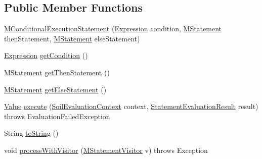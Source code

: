 \subsection*{Public Member Functions}
\begin{DoxyCompactItemize}
\item 
\hyperlink{classorg_1_1tzi_1_1use_1_1uml_1_1sys_1_1soil_1_1_m_conditional_execution_statement_a8b14f4421b03f5361b62804e4371c446}{M\-Conditional\-Execution\-Statement} (\hyperlink{classorg_1_1tzi_1_1use_1_1uml_1_1ocl_1_1expr_1_1_expression}{Expression} condition, \hyperlink{classorg_1_1tzi_1_1use_1_1uml_1_1sys_1_1soil_1_1_m_statement}{M\-Statement} then\-Statement, \hyperlink{classorg_1_1tzi_1_1use_1_1uml_1_1sys_1_1soil_1_1_m_statement}{M\-Statement} else\-Statement)
\item 
\hyperlink{classorg_1_1tzi_1_1use_1_1uml_1_1ocl_1_1expr_1_1_expression}{Expression} \hyperlink{classorg_1_1tzi_1_1use_1_1uml_1_1sys_1_1soil_1_1_m_conditional_execution_statement_a7aea1a87cdf4e493e90c0b4ce759679f}{get\-Condition} ()
\item 
\hyperlink{classorg_1_1tzi_1_1use_1_1uml_1_1sys_1_1soil_1_1_m_statement}{M\-Statement} \hyperlink{classorg_1_1tzi_1_1use_1_1uml_1_1sys_1_1soil_1_1_m_conditional_execution_statement_a1bc73008734e2c8293481938499e574f}{get\-Then\-Statement} ()
\item 
\hyperlink{classorg_1_1tzi_1_1use_1_1uml_1_1sys_1_1soil_1_1_m_statement}{M\-Statement} \hyperlink{classorg_1_1tzi_1_1use_1_1uml_1_1sys_1_1soil_1_1_m_conditional_execution_statement_ac3857655c85677889ec2a7f46478d9d4}{get\-Else\-Statement} ()
\item 
\hyperlink{classorg_1_1tzi_1_1use_1_1uml_1_1ocl_1_1value_1_1_value}{Value} \hyperlink{classorg_1_1tzi_1_1use_1_1uml_1_1sys_1_1soil_1_1_m_conditional_execution_statement_a2ff1033ad19583b26436cdaf74007f70}{execute} (\hyperlink{classorg_1_1tzi_1_1use_1_1uml_1_1sys_1_1soil_1_1_soil_evaluation_context}{Soil\-Evaluation\-Context} context, \hyperlink{classorg_1_1tzi_1_1use_1_1uml_1_1sys_1_1_statement_evaluation_result}{Statement\-Evaluation\-Result} result)  throws Evaluation\-Failed\-Exception 
\item 
String \hyperlink{classorg_1_1tzi_1_1use_1_1uml_1_1sys_1_1soil_1_1_m_conditional_execution_statement_aff4c32cc48445950a86a56ea261a85d9}{to\-String} ()
\item 
void \hyperlink{classorg_1_1tzi_1_1use_1_1uml_1_1sys_1_1soil_1_1_m_conditional_execution_statement_adfbe6eb1dcf7c556b25cacf8afb67d69}{process\-With\-Visitor} (\hyperlink{interfaceorg_1_1tzi_1_1use_1_1uml_1_1sys_1_1soil_1_1_m_statement_visitor}{M\-Statement\-Visitor} v)  throws Exception 
\end{DoxyCompactItemize}
